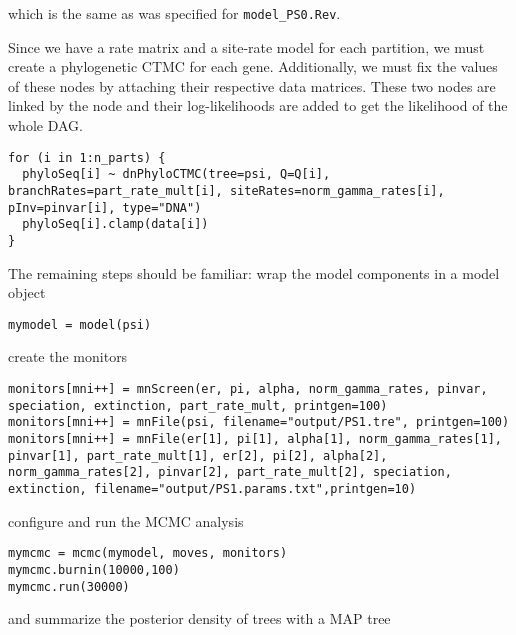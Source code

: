 which is the same as was specified for {\tt model\_PS0.Rev}.

Since we have a rate matrix and a site-rate model for each partition, we must create a phylogenetic CTMC for each gene. 
Additionally, we must fix the values of these nodes by attaching their respective data matrices.
These two nodes are linked by the  node and their log-likelihoods are added to get the likelihood of the whole DAG.
{\tt \begin{snugshade*}
\begin{lstlisting}
for (i in 1:n_parts) {
  phyloSeq[i] ~ dnPhyloCTMC(tree=psi, Q=Q[i], branchRates=part_rate_mult[i], siteRates=norm_gamma_rates[i], pInv=pinvar[i], type="DNA")
  phyloSeq[i].clamp(data[i])
}
\end{lstlisting}
\end{snugshade*}}

The remaining steps should be familiar:
wrap the model components in a model object

{\tt \begin{snugshade*}
\begin{lstlisting}
mymodel = model(psi)
\end{lstlisting}
\end{snugshade*}}

create the monitors

{\tt \begin{snugshade*}
\begin{lstlisting}
monitors[mni++] = mnScreen(er, pi, alpha, norm_gamma_rates, pinvar, speciation, extinction, part_rate_mult, printgen=100)
monitors[mni++] = mnFile(psi, filename="output/PS1.tre", printgen=100)
monitors[mni++] = mnFile(er[1], pi[1], alpha[1], norm_gamma_rates[1], pinvar[1], part_rate_mult[1], er[2], pi[2], alpha[2], norm_gamma_rates[2], pinvar[2], part_rate_mult[2], speciation, extinction, filename="output/PS1.params.txt",printgen=10)
\end{lstlisting}
\end{snugshade*}}

configure and run the MCMC analysis

{\tt \begin{snugshade*}
\begin{lstlisting}
mymcmc = mcmc(mymodel, moves, monitors)
mymcmc.burnin(10000,100)
mymcmc.run(30000)
\end{lstlisting}
\end{snugshade*}}

and summarize the posterior density of trees with a MAP tree

